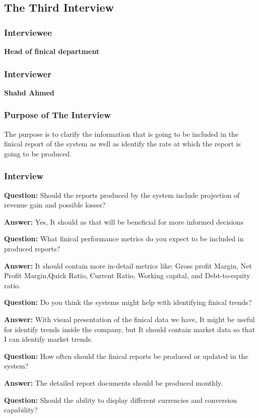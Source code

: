 \documentclass{article}
\begin{document}
\subsection{The Third Interview}
\subsubsection{Interviewee}
\textbf{Head of finical department}
\subsubsection{Interviewer}
\textbf{Shahd Ahmed}
\subsubsection{Purpose of The Interview}
The purpose is to clarify the information that is going to be included in the finical report of the system as well as identify the rate at which the report is going to be produced.
\subsubsection{Interview}

\textbf{Question:} Should the reports produced by the system include projection of revenue gain and possible losses?

\textbf{Answer:} Yes, It should as that will be beneficial for more informed decisions

\textbf{Question:} What finical performance metrics do you expect to be included in produced reports?

\textbf{Answer:} It should contain more in-detail metrics like: Gross profit Margin, Net Profit Margin,Quick Ratio, Current Ratio, Working capital, and Debt-to-equity ratio.

\textbf{Question:} Do you think the systems might help with identifying finical trends?

\textbf{Answer:} With visual presentation of the finical data we have, It might be useful for identify trends inside the company, but It should contain market data so that I can identify market trends.

\textbf{Question:} How often should the finical reports be produced or updated in the system?

\textbf{Answer:} The detailed report documents should be produced monthly.

\textbf{Question:} Should the ability to display different currencies and conversion capability?
\end{document}

